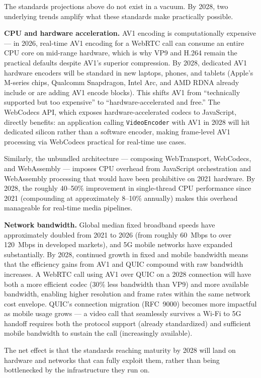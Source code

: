 \documentclass[11pt]{article}
\begin{document}
The standards projections above do not exist in a vacuum. By 2028, two
underlying trends amplify what these standards make practically possible.

\textbf{CPU and hardware acceleration.} AV1 encoding is computationally
expensive --- in 2026, real-time AV1 encoding for a WebRTC call can consume
an entire CPU core on mid-range hardware, which is why VP9 and H.264 remain
the practical defaults despite AV1's superior compression. By 2028, dedicated
AV1 hardware encoders will be standard in new laptops, phones, and tablets
(Apple's M-series chips, Qualcomm Snapdragon, Intel Arc, and AMD RDNA
already include or are adding AV1 encode blocks). This shifts AV1 from
``technically supported but too expensive'' to ``hardware-accelerated and
free.'' The WebCodecs API, which exposes hardware-accelerated codecs to
JavaScript, directly benefits: an application calling
\texttt{VideoEncoder} with AV1 in 2028 will hit dedicated silicon rather than
a software encoder, making frame-level AV1 processing via WebCodecs
practical for real-time use cases.

Similarly, the unbundled architecture --- composing WebTransport, WebCodecs,
and WebAssembly --- imposes CPU overhead from JavaScript orchestration and
WebAssembly processing that would have been prohibitive on 2021 hardware.
By 2028, the roughly 40--50\% improvement in single-thread CPU performance
since 2021 (compounding at approximately 8--10\% annually) makes this
overhead manageable for real-time media pipelines.

\textbf{Network bandwidth.} Global median fixed broadband speeds have
approximately doubled from 2021 to 2026 (from roughly 60~Mbps to over
120~Mbps in developed markets), and 5G mobile networks have expanded
substantially. By 2028, continued growth in fixed and mobile bandwidth
means that the efficiency gains from AV1 and QUIC compound with raw
bandwidth increases. A WebRTC call using AV1 over QUIC on a 2028 connection
will have both a more efficient codec (30\% less bandwidth than VP9) and
more available bandwidth, enabling higher resolution and frame rates within
the same network cost envelope. QUIC's connection migration (RFC~9000)
becomes more impactful as mobile usage grows --- a video call that seamlessly
survives a Wi-Fi to 5G handoff requires both the protocol support (already
standardized) and sufficient mobile bandwidth to sustain the call (increasingly
available).

The net effect is that the standards reaching maturity by 2028 will land on
hardware and networks that can fully exploit them, rather than being
bottlenecked by the infrastructure they run on.
\end{document}
